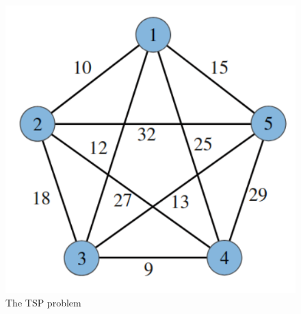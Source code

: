 \begin{figure}[H]
  \centering
  \includegraphics[width=.4\textwidth]{res/tsp.png}
  \caption{The TSP problem}\label{fig:tsp}
\end{figure}